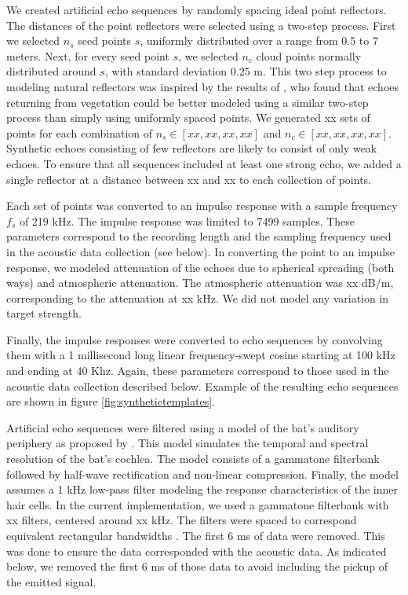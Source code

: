 \documentclass[preprint,5p]{elsarticle}
\begin{document}
We created artificial echo sequences by randomly spacing ideal point reflectors. The distances of the point reflectors were selected using a two-step process. First we selected $n_{s}$ seed points $s$, uniformly distributed over a range from 0.5 to 7 meters. Next, for every seed point $s$, we selected $n_{c}$ cloud points normally distributed around $s$, with standard deviation 0.25 m. This two step process to modeling natural reflectors was inspired by the results of \citet{Yovel2009}, who found that echoes returning from vegetation could be better modeled using a similar two-step process than simply using uniformly spaced points. We generated xx sets of points for each combination of $n_s \in [xx,xx,xx, xx]$ and $n_c \in [xx, xx, xx, xx]$. Synthetic echoes consisting of few reflectors are likely to consist of only weak echoes. To ensure that all sequences included at least one strong echo, we added a single reflector at a distance between xx and xx to each collection of points.

Each set of points was converted to an impulse response with a sample frequency $f_s$ of 219 kHz. The impulse response was limited to 7499 samples. These parameters correspond to the recording length and the sampling frequency used in the acoustic data collection (see below). In converting the point to an impulse response, we modeled attenuation of the echoes due to spherical spreading (both ways) and atmospheric attenuation. The atmospheric attenuation was xx dB/m, corresponding to the attenuation at xx kHz. We did not model any variation in target strength.


Finally, the impulse responses were converted to echo sequences by convolving them with a 1 millisecond long linear frequency-swept cosine starting at 100 kHz and ending at 40 Khz. Again, these parameters correspond to those used in the acoustic data collection described below. Example of the resulting echo sequences are shown in figure \ref{fig:synthetictemplates}. 

Artificial echo sequences were filtered using a model of the bat's auditory periphery as proposed by \citet{Wiegrebe2008}. This model simulates the temporal and spectral resolution of the bat's cochlea. The model consists of a gammatone filterbank followed by half-wave rectification and non-linear compression. Finally, the model assumes a 1 kHz low-pass filter modeling the response characteristics of the inner hair cells. In the current implementation, we used a gammatone filterbank with xx filters, centered around xx kHz. The filters were spaced to correspond equivalent rectangular bandwidths \citep{Glasberg1990}. The first 6 ms of data were removed. This was done to ensure the data corresponded with the acoustic data. As indicated below, we removed the first 6 ms of those data to avoid including the pickup of the emitted signal. 
\end{document}
